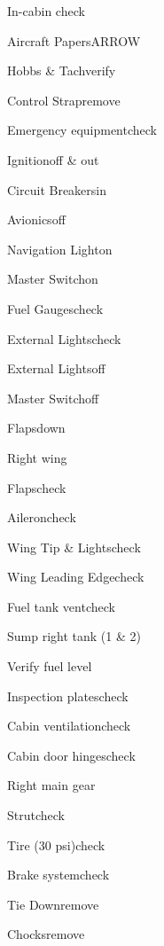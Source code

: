 




\begin{multicols}{2}
\begin{checklist}{In-cabin check}
  \item{Aircraft Papers}{ARROW}
  \item{Hobbs \& Tach}{verify}
  \item{Control Strap}{remove}
  \item{Emergency equipment}{check}
  \item{Ignition}{off \& out}
  \item{Circuit Breakers}{in}
  \item{Avionics}{off}
  \item{Navigation Light}{on}
  \item{Master Switch}{on}
  \item{Fuel Gauges}{check}
  \item{External Lights}{check}
  \item{External Lights}{off}
  \item{Master Switch}{off}
  \item{Flaps}{down}
\end{checklist}

\begin{checklist}{Right wing}
  \item{Flaps}{check}
  \item{Aileron}{check}
  \item{Wing Tip \& Lights}{check}
  \item{Wing Leading Edge}{check}
  \item{Fuel tank vent}{check}
  \item{Sump right tank (1 \& 2)}{}
  \item{Verify fuel level}{}
  \item{Inspection plates}{check}
  \item{Cabin ventilation}{check}
  \item{Cabin door hinges}{check}
\end{checklist}

\begin{checklist}{Right main gear}
  \item{Strut}{check}
  \item{Tire (30 psi)}{check}
  \item{Brake system}{check}
  \item{Tie Down}{remove}
  \item{Chocks}{remove}
\end{checklist}


\end{multicols}

